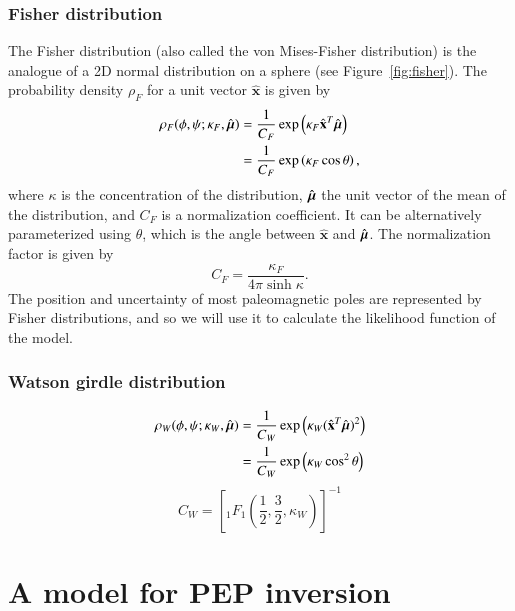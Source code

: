 \documentclass[preprint,12pt,authoryear]{elsarticle}
\newcommand{\mitbf}[1]{\hbox{\mathversion{bold}$#1$}}
\begin{document}
\subsubsection{Fisher distribution}
The Fisher distribution (also called the von Mises-Fisher distribution) is the analogue
of a 2D normal distribution on a sphere (see Figure~\ref{fig:fisher}).
The probability density $\rho_F$ for a unit vector $\hat{\mathbf{x}}$ is given by
\begin{equation}
  \begin{aligned}
  \rho_F(\phi, \psi ; \kappa_F, \hat{\mitbf{\mu}}) 
  &= \frac{1}{C_F} \exp \left( \kappa_F \hat{\mathbf{x}}^T \hat{\mitbf{\mu}} \right) \\
  &= \frac{1}{C_F} \exp \left( \kappa_F \cos \theta \right),
  \end{aligned}
\end{equation}
where $\kappa$ is the concentration of the distribution, 
$\hat{\mitbf{\mu}}$ the unit vector of the mean of the distribution, 
and $C_F$ is a normalization coefficient. It can be alternatively
parameterized using $\theta$, which is the angle between $\hat{\mathbf{x}}$ and $\hat{\mitbf{\mu}}$.
The normalization factor is given by 
\begin{equation}
  C_F = \frac{\kappa_F}{4 \pi \sinh{\kappa}}.
\end{equation}
The position and uncertainty of most paleomagnetic poles are represented by Fisher distributions,
and so we will use it to calculate the likelihood function of the model.

\subsubsection{Watson girdle distribution}
\begin{equation}
  \begin{aligned}
  \rho_W(\phi, \psi; \kappa_W, \hat{\mitbf{\mu}}) 
  &= \frac{1}{C_W} \exp \left( \kappa_W (\hat{\mathbf{x}}^T \hat{\mitbf{\mu}})^2 \right) \\
  &= \frac{1}{C_W} \exp \left( \kappa_W \cos^2 \theta \right)
  \end{aligned}
\end{equation}
\begin{equation}
  C_W = \left[ {}_1 F_1 \left( \frac{1}{2}, \frac{3}{2}, \kappa_W \right) \right]^{-1}
\end{equation}


\section{A model for PEP inversion}
\label{sec:model}
\end{document}

